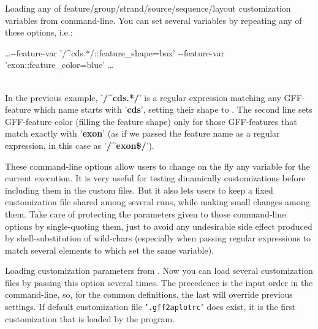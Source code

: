 %
%
   { Loading any of feature/group/strand/source/sequence/layout customization variables from command-line. You can set several variables by repeating any of these options, i.e.:\\[1.5ex] 
 \begin{minipage}{\linewidth} \begin{center} \sffamily\small \ldots -\/-feature-var '/\^{ }cds.*/::feature\_shape=box' -\/-feature-var 'exon::feature\_color=blue' \ldots \end{center} \end{minipage}\\[1.5ex] 
 In the previous example, '\textbf{\textsf{/\^{ }cds.*/}}' is a regular expression matching any GFF-feature which name starts with '\textbf{\textsf{cds}}', setting their shape to . The second line sets GFF-feature color (filling the feature shape) only for those GFF-features that match exactly with '\textbf{\textsf{exon}}' (as if we passed the feature name as a regular expression, in this case as '\textbf{\textsf{/\^{ }exon\$/}}'). 
 
 These command-line options allow users to change on the fly any variable for the current {\prog} execution. It is very useful for testing dinamically customizations before including them in the custom files. But it also lets users to keep a fixed customization file shared among several runs, while making small changes among them. Take care of protecting the parameters given to those command-line options by single-quoting them, just to avoid any undesirable side effect produced by shell-substitution of wild-chars (especially when passing regular expressions to match several elements to which set the same variable). }
%
   { Loading customization parameters from . Now you can load several customization files by passing this option several times. The precedence is the input order in the command-line, so, for the common definitions, the last  will override previous  settings. If default customization file "\texttt{.gff2aplotrc}" does exist, it is the first customization that is loaded by the program. }
%
   { {\tbdef} }
%
